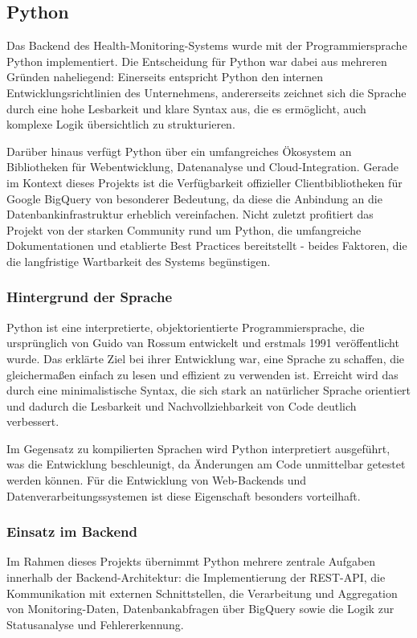\subsection{Python}
Das Backend des Health-Monitoring-Systems wurde mit der Programmiersprache Python implementiert. Die Entscheidung für Python war dabei aus mehreren Gründen naheliegend: Einerseits entspricht Python den internen Entwicklungsrichtlinien des Unternehmens, andererseits zeichnet sich die Sprache durch eine hohe Lesbarkeit und klare Syntax aus, die es ermöglicht, auch komplexe Logik übersichtlich zu strukturieren.

Darüber hinaus verfügt Python über ein umfangreiches Ökosystem an Bibliotheken für Webentwicklung, Datenanalyse und Cloud-Integration. Gerade im Kontext dieses Projekts ist die Verfügbarkeit offizieller Clientbibliotheken für Google BigQuery von besonderer Bedeutung, da diese die Anbindung an die Datenbankinfrastruktur erheblich vereinfachen. Nicht zuletzt profitiert das Projekt von der starken Community rund um Python, die umfangreiche Dokumentationen und etablierte Best Practices bereitstellt - beides Faktoren, die die langfristige Wartbarkeit des Systems begünstigen.

\subsubsection{Hintergrund der Sprache}
Python ist eine interpretierte, objektorientierte Programmiersprache, die ursprünglich von Guido van Rossum entwickelt und erstmals 1991 veröffentlicht wurde. Das erklärte Ziel bei ihrer Entwicklung war, eine Sprache zu schaffen, die gleichermaßen einfach zu lesen und effizient zu verwenden ist. Erreicht wird das durch eine minimalistische Syntax, die sich stark an natürlicher Sprache orientiert und dadurch die Lesbarkeit und Nachvollziehbarkeit von Code deutlich verbessert.

Im Gegensatz zu kompilierten Sprachen wird Python interpretiert ausgeführt, was die Entwicklung beschleunigt, da Änderungen am Code unmittelbar getestet werden können. Für die Entwicklung von Web-Backends und Datenverarbeitungssystemen ist diese Eigenschaft besonders vorteilhaft. \cite{python_docs, python_overview}

\subsubsection{Einsatz im Backend}
Im Rahmen dieses Projekts übernimmt Python mehrere zentrale Aufgaben innerhalb der Backend-Architektur: die Implementierung der REST-API, die Kommunikation mit externen Schnittstellen, die Verarbeitung und Aggregation von Monitoring-Daten, Datenbankabfragen über BigQuery sowie die Logik zur Statusanalyse und Fehlererkennung.

